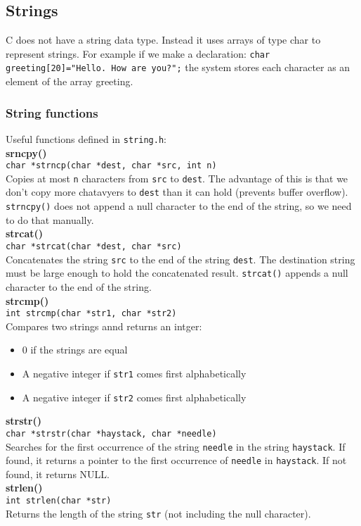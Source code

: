 \documentclass[a4paper, 10pt]{article}
\begin{document}
\subsection{Strings}
C does not have a string data type. Instead it uses arrays of type char to represent strings. For example if we make a declaration:
\texttt{char greeting[20]="Hello. How are you?";}
the system stores each character as an element of the array greeting.
\subsubsection{String functions}
Useful functions defined in \texttt{string.h}: \\[2ex]
\textbf{srncpy()} \\
\texttt{char *strncp(char *dest, char *src, int n)} \\
Copies at most \texttt{n} characters from \texttt{src} to \texttt{dest}. The advantage of this is that we don't copy more chatavyers to \texttt{dest} than it can hold (prevents buffer overflow). \texttt{strncpy()} does not append a null character to the end of the string, so we need to do that manually. \\[2ex]
\textbf{strcat()} \\
\texttt{char *strcat(char *dest, char *src)} \\
Concatenates the string \texttt{src} to the end of the string \texttt{dest}. The destination string must be large enough to hold the concatenated result. \texttt{strcat()} appends a null character to the end of the string. \\[2ex]
\textbf{strcmp()} \\
\texttt{int strcmp(char *str1, char *str2)} \\
Compares two strings annd returns an intger:
\begin{itemize}
    \item 0 if the strings are equal
    \item A negative integer if \texttt{str1} comes first alphabetically
    \item A negative integer if \texttt{str2} comes first alphabetically
\end{itemize}
\textbf{strstr()} \\
\texttt{char *strstr(char *haystack, char *needle)} \\
Searches for the first occurrence of the string \texttt{needle} in the string \texttt{haystack}. If found, it returns a pointer to the first occurrence of \texttt{needle} in \texttt{haystack}. If not found, it returns NULL. \\[2ex]
\textbf{strlen()} \\
\texttt{int strlen(char *str)} \\
Returns the length of the string \texttt{str} (not including the null character).
\end{document}
